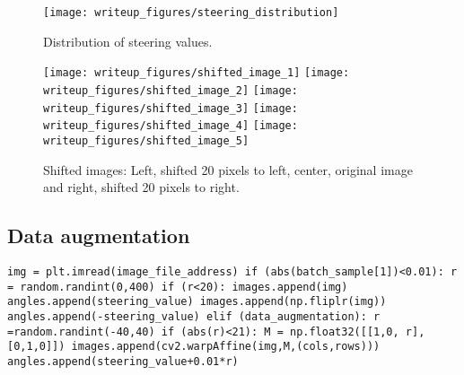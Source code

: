 \documentclass[12pt,a4paper]{article}
\begin{document}
	\begin{figure}[H]
		\centering
		\texttt{[image: writeup\_figures/steering\_distribution]}
		\caption{Distribution of steering values.}
		\label{fig:distribution}
	\end{figure}

	\begin{figure}[H]
		\centering
		\texttt{[image: writeup\_figures/shifted\_image\_1]}
		\texttt{[image: writeup\_figures/shifted\_image\_2]}
		\texttt{[image: writeup\_figures/shifted\_image\_3]}
		\texttt{[image: writeup\_figures/shifted\_image\_4]}
		\texttt{[image: writeup\_figures/shifted\_image\_5]}
		\caption{Shifted images: Left, shifted 20 pixels to left, center, original image and right, shifted 20 pixels to right.}
		\label{fig:shiftedimages}
	\end{figure}

	\subsection{Data augmentation}
	
	\texttt{img = plt.imread(image\_file\_address) \newline
		if (abs(batch\_sample[1])<0.01):\newline
		\hspace*{0.5cm} r = random.randint(0,400)\newline
		\hspace*{0.5cm} if (r<20):\newline
		\hspace*{1.0cm} images.append(img)\newline
		\hspace*{1.0cm} angles.append(steering\_value)\newline
		\hspace*{1.0cm} images.append(np.fliplr(img))\newline
		\hspace*{1.0cm} angles.append(-steering\_value)\newline
		\hspace*{0.5cm} elif (data\_augmentation):\newline
		\hspace*{1.0cm} r =random.randint(-40,40)\newline
		\hspace*{1.0cm} 
		\hspace*{1.0cm} if (abs(r)<21):\newline
		\hspace*{1.5cm} M = np.float32([[1,0, r],[0,1,0]])\newline
		\hspace*{1.5cm}  images.append(cv2.warpAffine(img,M,(cols,rows)))\newline
		\hspace*{1.5cm} angles.append(steering\_value+0.01*r)}
	
\end{document}
